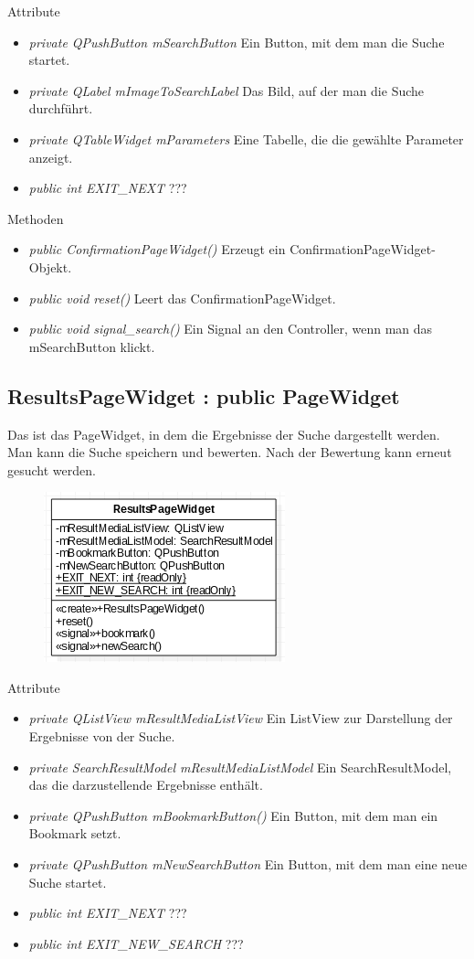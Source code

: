 Attribute
\begin{itemize}
	\item\textit{private QPushButton mSearchButton}
	Ein Button, mit dem man die Suche startet.
	\item\textit{private QLabel mImageToSearchLabel}
	Das Bild, auf der man die Suche durchführt.
	\item\textit{private QTableWidget mParameters}
	Eine Tabelle, die die gewählte Parameter anzeigt.
	\item\textit{public int EXIT\_NEXT} 
	??? 
\end{itemize}

Methoden
\begin{itemize}
	\item\textit{public ConfirmationPageWidget()}
	Erzeugt ein ConfirmationPageWidget-Objekt.
	\item\textit{public void reset()}
	Leert das ConfirmationPageWidget. 
	\item\textit{public void signal\_search()}
	Ein Signal an den Controller, wenn man das mSearchButton klickt.
\end{itemize}

\subsection*{ResultsPageWidget : public PageWidget}
Das ist das PageWidget, in dem die Ergebnisse der Suche dargestellt werden. Man kann die Suche speichern und bewerten. Nach der Bewertung kann erneut gesucht werden.

\begin{figure}[H]
	\centering
	\includegraphics[scale=0.5]{img/Klassendiagramm/Klassen/View/ResultsPageWidget}
	\label{fig:resultsPageWidget}
\end{figure}

Attribute
\begin{itemize}
	\item\textit{private QListView mResultMediaListView}
	Ein ListView zur Darstellung der Ergebnisse von der Suche.
	\item\textit{private SearchResultModel mResultMediaListModel}
	Ein SearchResultModel, das die darzustellende Ergebnisse enthält.
	\item\textit{private QPushButton mBookmarkButton()}
	Ein Button, mit dem man ein Bookmark setzt.
	\item\textit{private QPushButton mNewSearchButton}
	Ein Button, mit dem man eine neue Suche startet.
	\item\textit{public int EXIT\_NEXT}  
	???
	\item\textit{public int EXIT\_NEW\_SEARCH}
	???  
\end{itemize}

